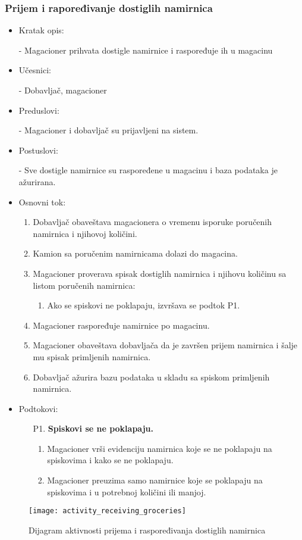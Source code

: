 
\subsubsection{Prijem i rapoređivanje dostiglih namirnica}

	\begin{itemize}
		\item{Kratak opis:} 
		
		- Magacioner prihvata dostigle namirnice i raspoređuje ih u magacinu
		\item{Učesnici:} 
		
		- Dobavljač, magacioner
		\item{Preduslovi:}
		
		- Magacioner i dobavljač su prijavljeni na sistem.
		\item{Postuslovi:}
		
		- Sve dostigle namirnice su raspoređene u magacinu i baza podataka je ažurirana.
		\item{Osnovni tok:}
		\begin{enumerate}
			\item{Dobavljač obaveštava magacionera o vremenu isporuke poručenih namirnica i njihovoj količini.}
			\item{Kamion sa poručenim namirnicama dolazi do magacina.}
			\item{Magacioner proverava spisak dostiglih namirnica i njihovu količinu sa listom poručenih namirnica:}
			\begin{enumerate}
			\item{Ako se spiskovi ne poklapaju, izvršava se podtok P1.}
			\end{enumerate}
			\item{Magacioner raspoređuje namirnice po magacinu.}
			\item{Magacioner obaveštava dobavljača da je završen prijem namirnica i šalje mu spisak primljenih namirnica.}
			\item{Dobavljač ažurira bazu podataka u skladu sa spiskom primljenih namirnica.}
		\end{enumerate}
		
		\item{Podtokovi:}
			\begin{enumerate}
				\item[P1.] \textbf{Spiskovi se ne poklapaju.} 
				\begin{enumerate}
				\item{Magacioner vrši evidenciju namirnica koje se ne poklapaju na spiskovima i kako se ne poklapaju.}
				\item{Magacioner preuzima samo namirnice koje se poklapaju na spiskovima i u potrebnoj količini ili manjoj.}
				\end{enumerate}
			\end{enumerate}
	\end{itemize}
\begin{figure}[H]
	\begin{center}
		\texttt{[image: activity\_receiving\_groceries]}
		\caption{Dijagram aktivnosti prijema i raspoređivanja dostiglih namirnica}
	\end{center}
\end{figure}
